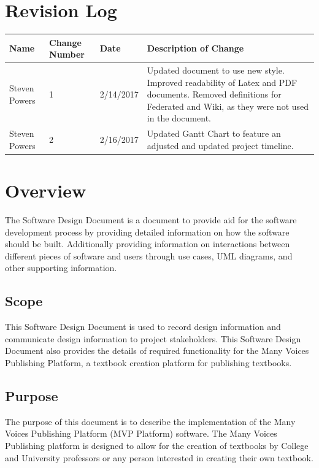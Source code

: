\documentclass[onecolumn, draftclsnofoot,10pt, compsoc]{IEEEtran}
\begin{document}
\section{Revision Log}
\begin{flushleft}
\tablehead{}
\begin{supertabular}{|p{3cm}|p{3cm}|p{3cm}|p{7cm}|}
\hline
Name & Change Number & Date & Description of Change  
\\\hline
Steven Powers & 1 & 2/14/2017 & Updated document to use new style.
								Improved readability of Latex and PDF
								documents. Removed definitions for Federated
								and Wiki, as they were not used in the 
								document.
\\\hline
Steven Powers & 2 & 2/16/2017 & Updated Gantt Chart to feature an adjusted 
								and updated project timeline.
\\ \hline
\end{supertabular}
\end{flushleft}

\section{Overview}
\noindent The Software Design Document is a document to provide aid
for the software development process by providing detailed information
on how the software should be built. Additionally providing information
on interactions between different pieces of software and users through
use cases, UML diagrams, and other supporting information.

\subsection{Scope}
\noindent This Software Design Document is used to record design
information and communicate design information to project stakeholders.
This Software Design Document also provides the details of required
functionality for the Many Voices Publishing Platform, a textbook creation
platform for publishing textbooks.

\subsection{Purpose}
\noindent The purpose of this document is to describe the implementation
of the Many Voices Publishing Platform (MVP Platform) software.
The Many Voices Publishing platform is designed to allow for the creation
of textbooks by College and University professors or any person interested
in creating their own textbook.
\end{document}
